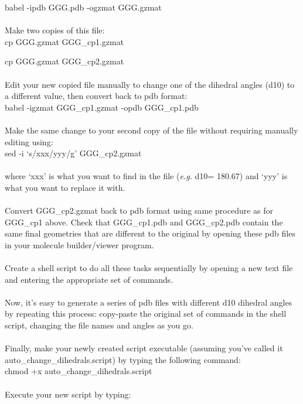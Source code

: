 \documentclass{article}
\begin{document}
babel -ipdb GGG.pdb -ogzmat GGG.gzmat\\
\\
\noindent
Make two copies of this file:\\

cp GGG.gzmat GGG\_cp1.gzmat

cp GGG.gzmat GGG\_cp2.gzmat\\
\\
\noindent
Edit your new copied file manually to change one of the dihedral angles (d10) to a different value, then convert back to pdb format:\\

babel -igzmat GGG\_cp1.gzmat -opdb GGG\_cp1.pdb\\
\\
\noindent
Make the same change to your second copy of the file without requiring manually editing using:\\

sed -i `s/xxx/yyy/g' GGG\_cp2.gzmat\\%
\\
\noindent
where `xxx' is what you want to find in the file (\textit{e.g.} d10= 180.67) and `yyy' is what you want to replace it with.\\
\\
\noindent
Convert GGG\_cp2.gzmat back to pdb format using same procedure as for GGG\_cp1 above. Check that GGG\_cp1.pdb and GGG\_cp2.pdb contain the same final geometries that are different to the original by opening these pdb files in your molecule builder/viewer program.\\
\\
Create a shell script to do all these tasks sequentially by opening a new text file and entering the appropriate set of commands. \\
\\
\noindent
Now, it's easy to generate a series of pdb files with different d10 dihedral angles by repeating this process: copy-paste the original set of commands in the shell script, changing the file names and angles as you go.\\
\\
\noindent
Finally, make your newly created script executable (assuming you've called it auto\_change\_dihedrals.script) by typing the following command:\\

chmod +x auto\_change\_dihedrals.script\\
\\
\noindent
Execute your new script by typing:\\
\end{document}
